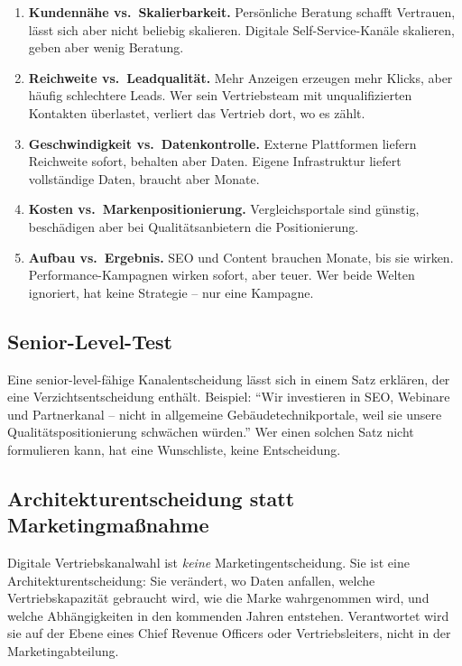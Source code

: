 \documentclass[11pt,a4paper,oneside]{article}
\begin{document}
\begin{enumerate}
  \item \textbf{Kundennähe vs.\ Skalierbarkeit.} Persönliche Beratung schafft Vertrauen, lässt sich aber nicht beliebig skalieren. Digitale Self-Service-Kanäle skalieren, geben aber wenig Beratung.
  \item \textbf{Reichweite vs.\ Leadqualität.} Mehr Anzeigen erzeugen mehr Klicks, aber häufig schlechtere Leads. Wer sein Vertriebsteam mit unqualifizierten Kontakten überlastet, verliert das Vertrieb dort, wo es zählt.
  \item \textbf{Geschwindigkeit vs.\ Datenkontrolle.} Externe Plattformen liefern Reichweite sofort, behalten aber Daten. Eigene Infrastruktur liefert vollständige Daten, braucht aber Monate.
  \item \textbf{Kosten vs.\ Markenpositionierung.} Vergleichsportale sind günstig, beschädigen aber bei Qualitätsanbietern die Positionierung.
  \item \textbf{Aufbau vs.\ Ergebnis.} SEO und Content brauchen Monate, bis sie wirken. Performance-Kampagnen wirken sofort, aber teuer. Wer beide Welten ignoriert, hat keine Strategie -- nur eine Kampagne.
\end{enumerate}

\subsection{Senior-Level-Test}

Eine senior-level-fähige Kanalentscheidung lässt sich in einem Satz erklären, der eine Verzichtsentscheidung enthält. Beispiel: ``Wir investieren in SEO, Webinare und Partnerkanal -- nicht in allgemeine Gebäudetechnikportale, weil sie unsere Qualitätspositionierung schwächen würden.'' Wer einen solchen Satz nicht formulieren kann, hat eine Wunschliste, keine Entscheidung.

\subsection{Architekturentscheidung statt Marketingmaßnahme}

Digitale Vertriebskanalwahl ist \emph{keine} Marketingentscheidung. Sie ist eine Architekturentscheidung: Sie verändert, wo Daten anfallen, welche Vertriebskapazität gebraucht wird, wie die Marke wahrgenommen wird, und welche Abhängigkeiten in den kommenden Jahren entstehen. Verantwortet wird sie auf der Ebene eines Chief Revenue Officers oder Vertriebsleiters, nicht in der Marketingabteilung.
\end{document}
